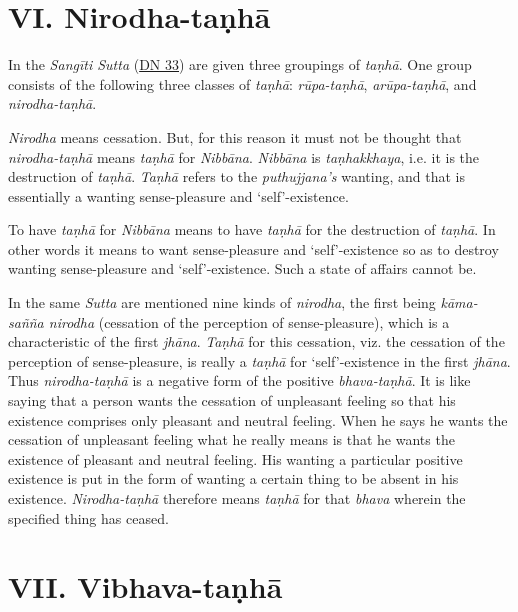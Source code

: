 \hypertarget{_vi_nirodha_taux1e47hux101}{%
\section{VI. Nirodha-taṇhā}\label{_vi_nirodha_taux1e47hux101}}

In the \textit{Sangīti Sutta} (\href{https://suttacentral.net/dn33/en/sujato}{DN 33}) are given three groupings of \textit{taṇhā}. One group consists of the following three classes of \textit{taṇhā}: \textit{rūpa-taṇhā}, \textit{arūpa-taṇhā}, and \textit{nirodha-taṇhā}.

\textit{Nirodha} means cessation. But, for this reason it must not be thought that \textit{nirodha-taṇhā} means \textit{taṇhā} for \textit{Nibbāna}. \textit{Nibbāna} is \textit{taṇhakkhaya}, i.e. it is the destruction of \textit{taṇhā}. \textit{Taṇhā} refers to the \textit{puthujjana's} wanting, and that is essentially a wanting sense-pleasure and `self'-existence.

To have \textit{taṇhā} for \textit{Nibbāna} means to have \textit{taṇhā} for the destruction of \textit{taṇhā}. In other words it means to want sense-pleasure and `self'-existence so as to destroy wanting sense-pleasure and `self'-existence. Such a state of affairs cannot be.

In the same \textit{Sutta} are mentioned nine kinds of \textit{nirodha}, the first being \textit{kāma-sañña nirodha} (cessation of the perception of sense-pleasure), which is a characteristic of the first \textit{jhāna}. \textit{Taṇhā} for this cessation, viz. the cessation of the perception of sense-pleasure, is really a \textit{taṇhā} for `self'-existence in the first \textit{jhāna}. Thus \textit{nirodha-taṇhā} is a negative form of the positive \textit{bhava-taṇhā}. It is like saying that a person wants the cessation of unpleasant feeling so that his existence comprises only pleasant and neutral feeling. When he says he wants the cessation of unpleasant feeling what he really means is that he wants the existence of pleasant and neutral feeling. His wanting a particular positive existence is put in the form of wanting a certain thing to be absent in his existence. \textit{Nirodha-taṇhā} therefore means \textit{taṇhā} for that \textit{bhava} wherein the specified thing has ceased.

\hypertarget{_vii_vibhava_taux1e47hux101}{%
\section{VII. Vibhava-taṇhā}\label{_vii_vibhava_taux1e47hux101}}

